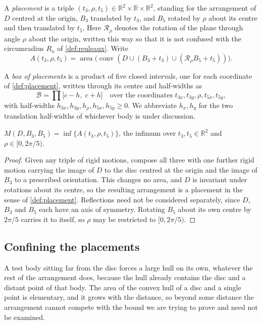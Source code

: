 \documentclass[a4paper,UKenglish,cleveref,autoref,thm-restate,numberwithinsect]{lipics-v2021}
\newcommand{\Rot}{\mathcal{R}}
\begin{document}
\begin{definition}
\label{def:placement}
A \emph{placement} is a triple $(t_3,\rho,t_5)\in\mathbb{R}^2\times\mathbb{R}
\times\mathbb{R}^2$, standing for the arrangement of $D$ centred at the origin,
$B_3$ translated by $t_3$, and $B_5$ rotated by $\rho$ about its centre and then
translated by $t_5$. Here $\Rot_\rho$ denotes the rotation of the plane through
angle $\rho$ about the origin, written this way so that it is not confused with
the circumradius $R_n$ of \cref{def:reuleaux}. Write
\[
  A(t_3,\rho,t_5)=\operatorname{area}
  \bigl(\operatorname{conv}(D\cup(B_3+t_3)\cup(\Rot_\rho B_5+t_5))\bigr).
\]
\end{definition}

\begin{definition}
\label{def:box}
A \emph{box of placements} is a product of five closed intervals, one for each
coordinate of \cref{def:placement}, written through its centre and half-widths as
\[
  \mathcal{B}
  =\prod\bigl[c-h,\;c+h\bigr]
  \quad\text{over the coordinates } t_{3x},t_{3y},\rho,t_{5x},t_{5y},
\]
with half-widths $h_{3x},h_{3y},h_\rho,h_{5x},h_{5y}\ge0$. We abbreviate
$h_x,h_y$ for the two translation half-widths of whichever body is under
discussion.
\end{definition}

\begin{lemma}
\label{lem:gauge}
$M(D,B_3,B_5)=\inf\{A(t_3,\rho,t_5)\}$, the infimum over
$t_3,t_5\in\mathbb{R}^2$ and $\rho\in[0,2\pi/5)$.
\end{lemma}

\begin{proof}
Given any triple of rigid motions, compose all three with one further rigid
motion carrying the image of $D$ to the disc centred at the origin and the image
of $B_3$ to a prescribed orientation. This changes no area, and $D$ is invariant
under rotations about its centre, so the resulting arrangement is a placement in
the sense of \cref{def:placement}. Reflections need not be considered separately,
since $D$, $B_3$ and $B_5$ each have an axis of symmetry. Rotating $B_5$ about
its own centre by $2\pi/5$ carries it to itself, so $\rho$ may be restricted to
$[0,2\pi/5)$.
\end{proof}

\subsection{Confining the placements}

A test body sitting far from the disc forces a large hull on its own, whatever
the rest of the arrangement does, because the hull already contains the disc and
a distant point of that body. The area of the convex hull of a disc and a single
point is elementary, and it grows with the distance, so beyond some distance the
arrangement cannot compete with the bound we are trying to prove and need not be
examined.
\end{document}
